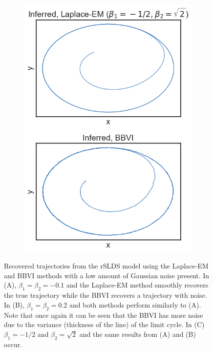 \begin{figure}
\begin{subfigure}[b]{0.33\linewidth}
        \includegraphics[width=\linewidth]{./Figures/bautin-lpc.png}
        \caption{}
        \label{bautinresults:c}
        \vspace{4ex}
    \end{subfigure}
    \caption{Recovered trajectories from the rSLDS model using the Laplace-EM and BBVI methods with a low amount of Gaussian noise present. In (A), $\beta_1 = \beta_2 = -0.1$ and the Laplace-EM method smoothly recovers the true trajectory while the BBVI recovers a trajectory with noise. In (B), $\beta_1 = \beta_2 = 0.2$ and both methods perform similarly to (A). Note that once again it can be seen that the BBVI has more noise due to the variance (thickness of the line) of the limit cycle. In (C) $\beta_1 = -1/2$ and $\beta_2 = \sqrt{2}$ and the same results from (A) and (B) occur.}
    \label{bautinresults}
\end{figure}